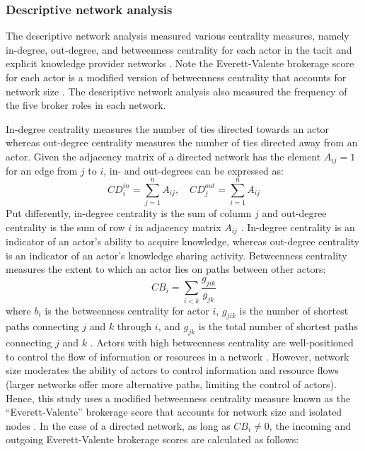 \subsubsection{Descriptive network analysis} \label{sss:descriptive_network_analysis}

The descriptive network analysis measured various centrality measures, namely in-degree, out-degree, and betweenness centrality for each actor in the tacit and explicit knowledge provider networks \citep{freeman1979centrality}. Note the Everett-Valente brokerage score for each actor is a modified version of betweenness centrality that accounts for network size  \citep{everett2016bridging}. The descriptive network analysis also measured the frequency of the five \citet{gould1989structures} broker roles in each network. \medskip 

In-degree centrality measures the number of ties directed towards an actor whereas out-degree centrality measures the number of ties directed away from an actor. Given the adjacency matrix of a directed network has the element $A_{ij} = 1$ for an edge from $j$ to $i$, in- and out-degrees can be expressed as: $$CD_i^{in} = \sum_{j = 1}^nA_{ij}, \,\,\,\,\,\, CD_j^{out} = \sum_{i = 1}^nA_{ij}$$ \noindent Put differently, in-degree centrality is the sum of column $j$ and out\hyp{}degree centrality is the sum of row $i$ in adjacency matrix $A_{ij}$ \citep{newman2010networks}. In-degree centrality is an indicator of an actor's ability to acquire knowledge, whereas out-degree centrality is an indicator of an actor's knowledge sharing activity. Betweenness centrality measures the extent to which an actor lies on paths between other actors: $$ CB_i=\sum_{i < k}\frac{g_{jik}}{g_{jk}} $$ where $b_i$ is the betweenness centrality for actor $i$, $g_{jik}$ is the number of shortest paths connecting $j$ and $k$ through $i$, and $g_{jk}$ is the total number of shortest paths connecting $j$ and $k$ \citep{freeman1979centrality}. Actors with high betweenness centrality are well\hyp{}positioned to control the flow of information or resources in a network \citep{everett2016bridging}. However, network size moderates the ability of actors to control information and resource flows (larger networks offer more alternative paths, limiting the control of actors). Hence, this study uses a modified betweenness centrality measure known as the \enquote{Everett-Valente} brokerage score that accounts for network size and isolated nodes \citep{everett2016bridging}. In the case of a directed network, as long as $CB_i \neq 0$, the incoming and outgoing Everett-Valente brokerage scores are calculated as follows: \medskip

